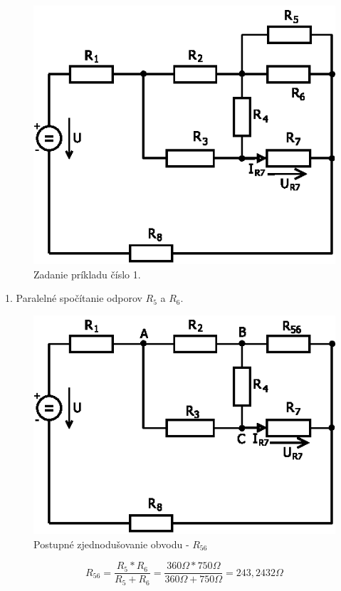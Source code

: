 \documentclass[a4paper,12pt]{article}
\begin{document}
\begin{figure}[!htb]
\centering
\includegraphics[scale=1.5]{p1/p0.eps}
\caption{Zadanie príkladu číslo 1.}
\end{figure}


1. Paralelné spočítanie odporov  $R_5$ a  $R_6$.
\begin{figure}[!htb]
\centering
\includegraphics[scale=1.5]{p1/p2.eps}
\caption{Postupné zjednodušovanie obvodu - $R_{56}$}
\end{figure}

\begin{equation}
R_{56} = \frac{R_5 * R_6}{ R_5 + R_6} = \frac{360\Omega*750\Omega}{360\Omega+750\Omega} = 243,2432\Omega
\end{equation}
\end{document}
